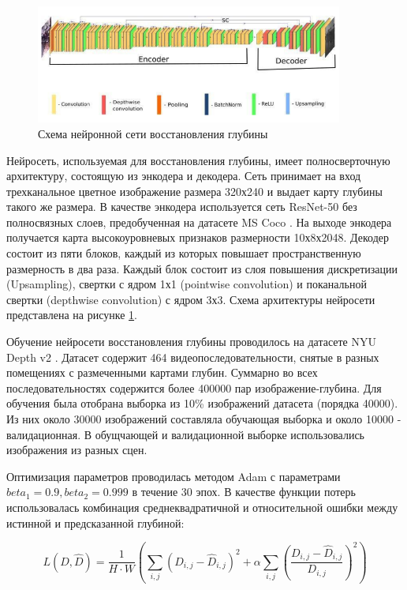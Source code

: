 \documentclass{mipt-thesis-ms}
\begin{document}
	\begin{figure}
		\centering
		\includegraphics[width=0.9\textwidth]{img/fcnn_scheme.png}
		\caption{Схема нейронной сети восстановления глубины}
		\label{figure_our_fcnn}
	\end{figure}
	
	Нейросеть, используемая для восстановления глубины, имеет полносверточную архитектуру, состоящую из энкодера и декодера. Сеть принимает на вход трехканальное цветное изображение размера 320х240 и выдает карту глубины такого же размера. В качестве энкодера используется сеть ResNet-50 \cite{he2016deep} без полносвязных слоев, предобученная на датасете MS Coco \cite{lin2014microsoft}. На выходе энкодера получается карта высокоуровневых признаков размерности 10х8х2048. Декодер состоит из пяти блоков, каждый из которых повышает пространственную размерность в два раза. Каждый блок состоит из слоя повышения дискретизации (Upsampling), свертки с ядром 1х1 (pointwise convolution) и поканальной свертки (depthwise convolution) с ядром 3х3. Схема архитектуры нейросети представлена на рисунке \ref{figure_our_fcnn}.
	
	Обучение нейросети восстановления глубины проводилось на датасете NYU Depth v2 \cite{silberman2012indoor}. Датасет содержит 464 видеопоследовательности, снятые в разных помещениях с размеченными картами глубин. Суммарно во всех последовательностях содержится более 400000 пар изображение-глубина. Для обучения была отобрана выборка из 10\% изображений датасета (порядка 40000). Из них около 30000 изображений составляла обучающая выборка и около 10000 - валидационная. В обущчающей и валидационной выборке использовались изображения из разных сцен.
	
	Оптимизация параметров проводилась методом Adam \cite{kingma2014adam} с параметрами $beta_1 = 0.9, beta_2 = 0.999$ в течение 30 эпох. В качестве функции потерь использовалась комбинация среднеквадратичной и относительной ошибки между истинной и предсказанной глубиной:
	
	\begin{equation}
		L(D, \widehat{D}) = \frac{1}{H \cdot W} (\sum\limits_{i,j} (D_{i,j} - \widehat{D}_{i,j})^2 + \alpha \sum\limits_{i,j} (\frac{D_{i,j} - \widehat{D}_{i,j}}{D_{i,j}})^2)
	\end{equation}
	
\end{document}
